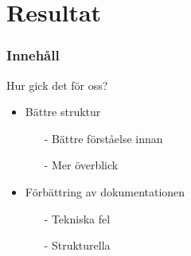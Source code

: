 \section{Resultat}
\begin{frame}
\frametitle{Innehåll}
\tableofcontents[currentsection]
\end{frame}

\begin{frame}{Hur gick det för oss?}

\begin{itemize}
\item Bättre struktur
\begin{itemize}
	\item[-] Bättre förståelse innan
	\item[-] Mer överblick
\end{itemize}
\item Förbättring av dokumentationen
\begin{itemize}
	\item[-] Tekniska fel
	\item[-] Strukturella
\end{itemize}
\end{itemize}

\end{frame}
